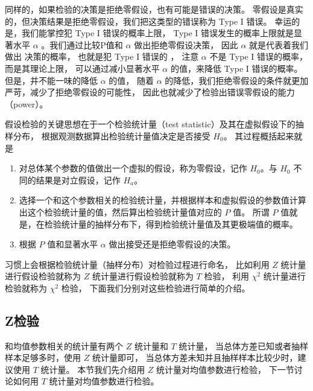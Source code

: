 \documentclass[letterpaper,10pt,english]{sphinxmanual}
\begin{document}

同样的，如果检验的决策是拒绝零假设，也有可能是错误的决策。
零假设是真实的，但决策结果是拒绝零假设，我们把这类型的错误称为 Type I 错误。
幸运的是，我们能掌控犯 Type I 错误的概率上限，
Type I 错误发生的概率上限就是显著水平 \(\alpha\)
。我们通过比较P值和  \(\alpha\) 做出拒绝零假设决策，
因此 \(\alpha\) 就是代表着我们做出  决策的概率，
也就是犯 Type I 错误的  ，
注意 \(\alpha\) 不是 Type I 错误的概率，而是其理论上限，
可以通过减小显著水平 \(\alpha\) 的值，来降低 Type I 错误的概率。
但是，并不能一味的降低 \(\alpha\) 的值，
随着  \(\alpha\) 的降低，我们拒绝零假设的条件就更加严苛，减少了拒绝零假设的可能性，
因此也就减少了检验出错误零假设的能力（power）。

假设检验的关键思想在于一个检验统计量（test statistic）及其在虚拟假设下的抽样分布，
根据观测数据算出检验统计量值决定是否接受 \(H_0\)。
其过程概括起来就是
\begin{enumerate}
%
\item {} 
对总体某个参数的值做出一个虚拟的假设，称为零假设，记作 \(H_0\)。与 \(H_0\) 不同的结果是对立假设，记作 \(H_a\)。

\item {} 
选择一个和这个参数相关的检验统计量，并根据样本和虚拟假设的参数值计算出这个检验统计量的值，然后算出检验统计量值对应的 \(P\) 值。
所谓 \(P\) 值就是，在检验统计量的抽样分布下，得到检验统计量值及其更极端值的概率。

\item {} 
根据 \(P\) 值和显著水平 \(\alpha\) 做出接受还是拒绝零假设的决策。

\end{enumerate}

习惯上会根据检验统计量（抽样分布）对检验过程进行命名，
比如利用 \(Z\) 统计量进行假设检验就称为 \(Z\) 统计量进行假设检验就称为 \(T\) 检验，
利用 \(\chi^2\) 统计量进行检验就称为 \(\chi^2\) 检验，
下面我们分别对这些检验进行简单的介绍。


\subsection{Z检验}
\label{\detokenize{_u63a8_u65ad_u4e0e_u68c0_u9a8c/content:id22}}
和均值参数相关的统计量有两个 \(Z\) 统计量和 \(T\) 统计量，
当总体方差已知或者抽样样本足够多时，使用 \(Z\) 统计量即可，
当总体方差未知并且抽样样本比较少时，建议使用 \(T\) 统计量。
本节我们先介绍用 \(Z\) 统计量对均值参数进行检验，
下一节讨论如何用 \(T\) 统计量对均值参数进行检验。
\end{document}
